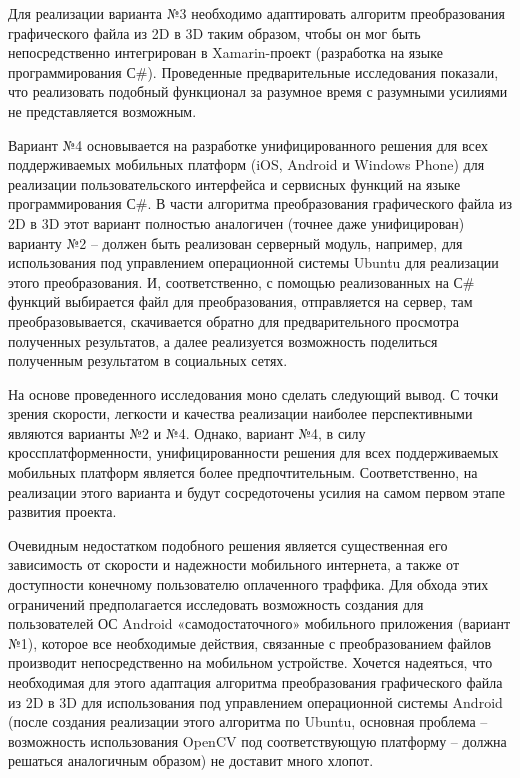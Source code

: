 Для реализации варианта №3 необходимо адаптировать алгоритм преобразования графического файла из 2D в 3D таким образом, чтобы он мог быть непосредственно интегрирован в Xamarin-проект (разработка на языке программирования С\#). Проведенные предварительные исследования показали, что реализовать подобный функционал за разумное время с разумными усилиями не представляется возможным.

Вариант №4 основывается на разработке унифицированного решения для всех поддерживаемых мобильных платформ (iOS, Android и Windows Phone) для реализации пользовательского интерфейса и сервисных функций на языке программирования С\#. В части алгоритма преобразования графического файла из 2D в 3D этот вариант полностью аналогичен (точнее даже унифицирован) варианту №2 – должен быть реализован серверный модуль, например, для использования под управлением операционной системы Ubuntu для реализации этого преобразования. И, соответственно, с помощью реализованных на С\# функций выбирается файл для преобразования, отправляется на сервер, там преобразовывается, скачивается обратно для предварительного просмотра полученных результатов, а далее реализуется возможность поделиться полученным результатом в социальных сетях.

На основе проведенного исследования моно сделать следующий вывод. С точки зрения скорости, легкости и качества реализации наиболее перспективными являются варианты №2 и №4. Однако, вариант №4, в силу кроссплатформенности, унифицированности решения для всех поддерживаемых мобильных платформ является более предпочтительным. Соответственно, на реализации этого варианта и будут сосредоточены усилия на самом первом этапе развития проекта. 

Очевидным недостатком подобного решения является существенная его зависимость от скорости и надежности мобильного интернета, а также от доступности конечному пользователю оплаченного траффика. Для обхода этих ограничений предполагается исследовать возможность создания для пользователей ОС Android «самодостаточного» мобильного приложения (вариант №1), которое все необходимые действия, связанные с преобразованием файлов производит непосредственно на мобильном устройстве. Хочется надеяться, что необходимая для этого адаптация алгоритма преобразования графического файла из 2D в 3D для использования под управлением операционной системы Android (после создания реализации этого алгоритма по Ubuntu, основная проблема – возможность использования OpenCV под соответствующую платформу – должна решаться аналогичным образом) не доставит много хлопот.


